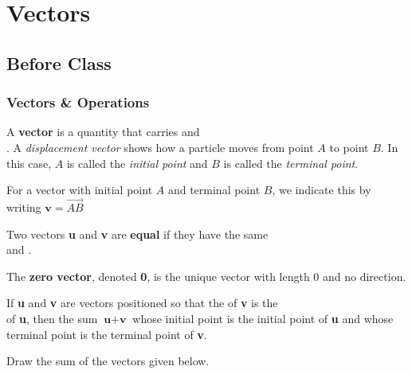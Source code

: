 \documentclass[notes]{subfiles}
\begin{document}
	\fancyhead[LO,RE]{\bfseries \small \currentname}
	\fancyfoot[C]{{}}
	\fancyfoot[RO,LE]{\large \thepage}	%
	
\section*{Vectors}\label{cs122}
	\subsection*{Before Class}
	\subsubsection*{Vectors \& Operations}
		\begin{defn}[Vector]
			A \textbf{vector} is a quantity that carries  and\\[15pt] .  A \emph{displacement vector} shows how a particle moves from point $A$ to point $B$.  In this case, $A$ is called the \emph{initial point} and $B$ is called the \emph{terminal point}. 
		\end{defn}
		
		\begin{rmk}[Notation]
			For a vector with initial point $A$ and terminal point $B$, we indicate this by writing $\textbf{v} = \overrightarrow{AB}$
		\end{rmk}
		\begin{defn}
			Two vectors \textbf{u} and \textbf{v} are \textbf{equal} if they have the same \\[15pt] and .
		\end{defn}
		\begin{defn}
			The \textbf{zero vector}, denoted \textbf{0}, is the unique vector with length 0 and no direction.
		\end{defn}
			\newpage
			
		\begin{rmk}
			If \textbf{u} and \textbf{v} are vectors positioned so that the  of \textbf{v} is the\\[15pt]  of \textbf{u}, then the sum $\textbf{u} + \textbf{v}$ whose initial point is the initial point of \textbf{u} and whose terminal point is the terminal point of \textbf{v}.
		\end{rmk}
		\begin{ex}
			Draw the sum of the vectors given below.
		\end{ex}	
			
\end{document}

